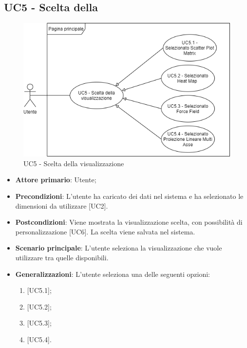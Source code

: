 \subsection{UC5 - Scelta della }
\begin{figure}[h]
\includegraphics[width=\linewidth]{Section/Images/UC5.png}
\centering
\caption{UC5 - Scelta della visualizzazione}
\end{figure}
\begin{itemize}
	\item \textbf{Attore primario}: Utente;
	\item \textbf{Precondizioni}: L'utente ha caricato dei dati nel sistema e ha selezionato le dimensioni da utilizzare [UC2].
	\item \textbf{Postcondizioni}: Viene mostrata la visualizzazione scelta, con possibilità di personalizzazione [UC6]. La scelta viene salvata nel sistema.
	\item \textbf{Scenario principale}: L'utente seleziona la visualizzazione che vuole utilizzare tra quelle disponibili.
	\item \textbf{Generalizzazioni}: L'utente seleziona una delle seguenti opzioni:
		\begin{enumerate}
			\item {} [UC5.1];
			\item {} [UC5.2];
			\item {} [UC5.3];
			\item {} [UC5.4].
		\end{enumerate}

\end{itemize}